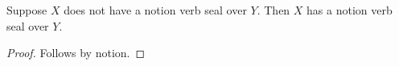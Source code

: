 

\begin{proposition}\label{notion_verb_negative}
    Suppose $X$ does not have a notion verb seal over $Y$.
    Then $X$ has a notion verb seal over $Y$.
\end{proposition}
\begin{proof}
    Follows by notion.
\end{proof}
